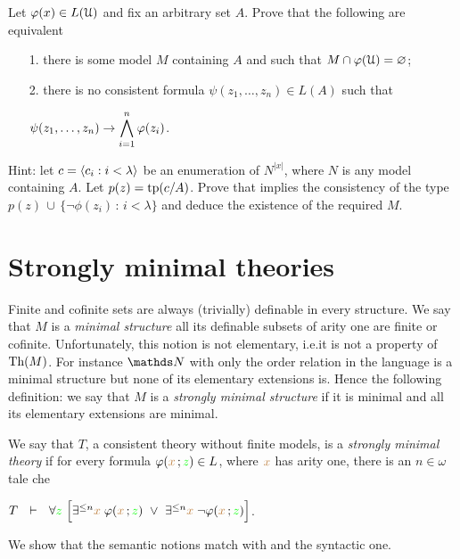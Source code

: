 \begin{exercise}
Let $\varphi(x)\in L(\EuScript U)$ and fix an arbitrary set $A$. Prove that the following are equivalent
\begin{itemize}
\item[1.] there is some model $M$ containing $A$ and such that $M\cap\varphi(\EuScript U)=\varnothing$;
\item[2.] there is no consistent formula $\psi(z_1,\dots,z_n)\in L(A)$ such that

 \hfil$\displaystyle\psi(z_1,\dots,z_n)\rightarrow\bigwedge^n_{i=1}\varphi(z_i)$.
\end{itemize}
Hint: let $c=\langle c_i:i<\lambda\rangle$ be an enumeration of $N^{|x|}$, where $N$ is any model containing $A$. Let $p(z)={\rm tp}(c/A)$.  Prove that  implies the consistency of the type $p(z)\,\cup\, \big\{\neg\phi(z_i)\, :\, i<\lambda\big\}$ and deduce the existence of the required $M$.\QED
\end{exercise}


\section{Strongly minimal theories\label{tfm}}%
 
Finite and cofinite sets are always (trivially) definable in every structure. We say that $M$ is a \emph{minimal structure\/} all its definable subsets of arity one are finite or cofinite. Unfortunately, this notion is not elementary, i.e.\@ it is not a property of $\textrm{Th}(M)$. For instance $\NN$ with only the order relation in the language is a minimal structure but none of its elementary extensions is.  Hence the following definition: we say that $M$ is a \emph{strongly minimal structure\/} if it is minimal and all its elementary extensions are minimal.

We say that $T$, a consistent theory without finite models, is a \emph{strongly minimal theory\/} if 
for every formula $\varphi({\color{brown} x}\,;{\color{green} z})\in L$, where ${\color{brown} x}$ has arity one, there is an  $n\in\omega$ tale che

\hfil$T\ \ \vdash\ \ \forall{\color{green}z}\ \Big[\exists^{\le n}{\color{brown} x}\;\varphi({\color{brown} x}\,;{\color{green} z})\ \vee\ \exists^{\le n}{\color{brown} x}\;\neg\varphi({\color{brown} x}\,;{\color{green} z})\Big]$.

We show that the semantic notions match with and the syntactic one.



